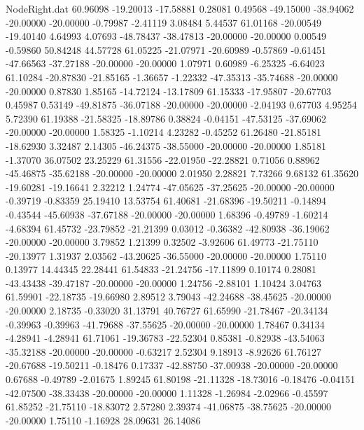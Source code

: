 \begin{filecontents}{NodeRight.dat}
  60.96098  -19.20013  -17.58881     0.28081    0.49568  -49.15000  -38.94062  -20.00000  -20.00000   -0.79987   -2.41119    3.08484    5.44537
  61.01168  -20.00549  -19.40140     4.64993    4.07693  -48.78437  -38.47813  -20.00000  -20.00000    0.00549   -0.59860   50.84248   44.57728
  61.05225  -21.07971  -20.60989    -0.57869   -0.61451  -47.66563  -37.27188  -20.00000  -20.00000    1.07971    0.60989   -6.25325   -6.64023
  61.10284  -20.87830  -21.85165    -1.36657   -1.22332  -47.35313  -35.74688  -20.00000  -20.00000    0.87830    1.85165  -14.72124  -13.17809
  61.15333  -17.95807  -20.67703     0.45987    0.53149  -49.81875  -36.07188  -20.00000  -20.00000   -2.04193    0.67703    4.95254    5.72390
  61.19388  -21.58325  -18.89786     0.38824   -0.04151  -47.53125  -37.69062  -20.00000  -20.00000    1.58325   -1.10214    4.23282   -0.45252
  61.26480  -21.85181  -18.62930     3.32487    2.14305  -46.24375  -38.55000  -20.00000  -20.00000    1.85181   -1.37070   36.07502   23.25229
  61.31556  -22.01950  -22.28821     0.71056    0.88962  -45.46875  -35.62188  -20.00000  -20.00000    2.01950    2.28821    7.73266    9.68132
  61.35620  -19.60281  -19.16641     2.32212    1.24774  -47.05625  -37.25625  -20.00000  -20.00000   -0.39719   -0.83359   25.19410   13.53754
  61.40681  -21.68396  -19.50211    -0.14894   -0.43544  -45.60938  -37.67188  -20.00000  -20.00000    1.68396   -0.49789   -1.60214   -4.68394
  61.45732  -23.79852  -21.21399     0.03012   -0.36382  -42.80938  -36.19062  -20.00000  -20.00000    3.79852    1.21399    0.32502   -3.92606
  61.49773  -21.75110  -20.13977     1.31937    2.03562  -43.20625  -36.55000  -20.00000  -20.00000    1.75110    0.13977   14.44345   22.28441
  61.54833  -21.24756  -17.11899     0.10174    0.28081  -43.43438  -39.47187  -20.00000  -20.00000    1.24756   -2.88101    1.10424    3.04763
  61.59901  -22.18735  -19.66980     2.89512    3.79043  -42.24688  -38.45625  -20.00000  -20.00000    2.18735   -0.33020   31.13791   40.76727
  61.65990  -21.78467  -20.34134    -0.39963   -0.39963  -41.79688  -37.55625  -20.00000  -20.00000    1.78467    0.34134   -4.28941   -4.28941
  61.71061  -19.36783  -22.52304     0.85381   -0.82938  -43.54063  -35.32188  -20.00000  -20.00000   -0.63217    2.52304    9.18913   -8.92626
  61.76127  -20.67688  -19.50211    -0.18476    0.17337  -42.88750  -37.00938  -20.00000  -20.00000    0.67688   -0.49789   -2.01675    1.89245
  61.80198  -21.11328  -18.73016    -0.18476   -0.04151  -42.07500  -38.33438  -20.00000  -20.00000    1.11328   -1.26984   -2.02966   -0.45597
  61.85252  -21.75110  -18.83072     2.57280    2.39374  -41.06875  -38.75625  -20.00000  -20.00000    1.75110   -1.16928   28.09631   26.14086

\end{filecontents}
